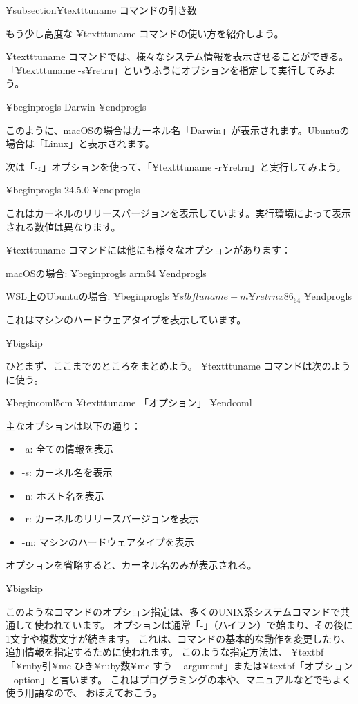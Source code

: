{¥subsection{¥texttt{uname} コマンドの引き数}

もう少し高度な ¥texttt{uname} コマンドの使い方を紹介しよう。

¥texttt{uname} コマンドでは、様々なシステム情報を表示させることができる。
「¥texttt{uname -s}¥retrn」というふうにオプションを指定して実行してみよう。

¥begin{progls}
Darwin
%
¥end{progls}

このように、macOSの場合はカーネル名「Darwin」が表示されます。Ubuntuの場合は「Linux」と表示されます。


次は「-r」オプションを使って、「¥texttt{uname -r}¥retrn」と実行してみよう。

¥begin{progls}
24.5.0
%
¥end{progls}

これはカーネルのリリースバージョンを表示しています。実行環境によって表示される数値は異なります。

¥texttt{uname} コマンドには他にも様々なオプションがあります：

macOSの場合:
¥begin{progls}
arm64
%
¥end{progls}

WSL上のUbuntuの場合:
¥begin{progls}
$ ¥slbfl{uname -m}¥retrn
x86_64
$
¥end{progls}

これはマシンのハードウェアタイプを表示しています。

¥bigskip

ひとまず、ここまでのところをまとめよう。
¥texttt{uname} コマンドは次のように使う。

¥begin{coml}{5cm}
¥texttt{uname} 「オプション」
¥end{coml}

主なオプションは以下の通り：
\begin{itemize}
\item -a: 全ての情報を表示
\item -s: カーネル名を表示
\item -n: ホスト名を表示
\item -r: カーネルのリリースバージョンを表示
\item -m: マシンのハードウェアタイプを表示
\end{itemize}

オプションを省略すると、カーネル名のみが表示される。

¥bigskip

このようなコマンドのオプション指定は、多くのUNIX系システムコマンドで共通して使われています。
オプションは通常「-」（ハイフン）で始まり、その後に1文字や複数文字が続きます。
これは、コマンドの基本的な動作を変更したり、追加情報を指定するために使われます。
このような指定方法は、
 ¥textbf{「¥ruby{引}{¥mc ひ}き¥ruby{数}{¥mc すう} -- argument」}または¥textbf{「オプション -- option」}と言います。
これはプログラミングの本や、マニュアルなどでもよく使う用語なので、
おぼえておこう。

}
